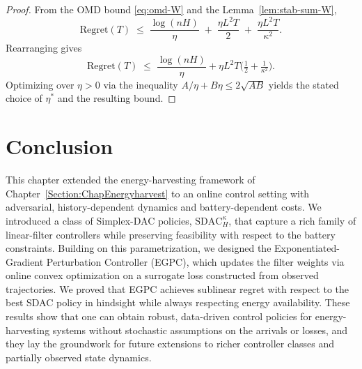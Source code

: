 \begin{proof}
From the OMD bound \eqref{eq:omd-W} and the Lemma~\ref{lem:stab-sum-W},
\[
\mathrm{Regret}(T)
\;\le\;
\frac{\log(nH)}{\eta}
\;+\;
\frac{\eta L^2 T}{2}
\;+\;
\frac{\eta L^2 T}{\kappa^2}.
\]
Rearranging gives
\[
\mathrm{Regret}(T)
\;\le\;
\frac{\log(n H)}{\eta} + \eta L^2 T\Big(\tfrac{1}{2}+\tfrac{1}{\kappa^2}\Big).
\]
Optimizing over \(\eta > 0\) via the inequality \(A/\eta + B\eta \le 2\sqrt{AB}\) yields the stated choice of \(\eta^*\) and the resulting bound.
\end{proof}






\section{Conclusion}
\label{sec:control_conclusion}

This chapter extended the energy-harvesting framework of Chapter~\ref{Section:ChapEnergyharvest} to an online control setting with adversarial, history-dependent dynamics and battery-dependent costs. We introduced a class of Simplex-DAC policies, \(\mathrm{SDAC}_H^\kappa\), that capture a rich family of linear-filter controllers while preserving feasibility with respect to the battery constraints. Building on this parametrization, we designed the Exponentiated-Gradient Perturbation Controller (EGPC), which updates the filter weights via online convex optimization on a surrogate loss constructed from observed trajectories. We proved that EGPC achieves sublinear regret with respect to the best SDAC policy in hindsight while always respecting energy availability. These results show that one can obtain robust, data-driven control policies for energy-harvesting systems without stochastic assumptions on the arrivals or losses, and they lay the groundwork for future extensions to richer controller classes and partially observed state dynamics.
